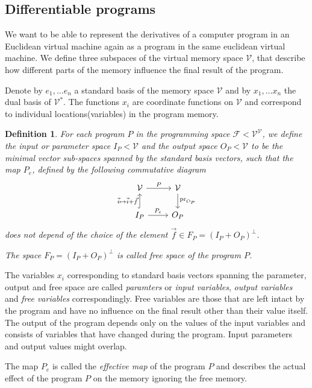 \documentclass[smallcondensed]{svjour3}
\newcommand{\VV}{\mathcal{V}}
\newcommand{\F}{\mathcal{F}}
\newtheorem{definicija}{Definition}[section]
\begin{document}
\subsection{Differentiable programs}
We want to be able to represent the derivatives of a computer program in an
Euclidean virtual machine again as a program in the same euclidean virtual
machine. We define three subspaces of the virtual memory space $\VV$, that
describe how different parts of the memory influence the final result of the
program.   

Denote by $e_1,\ldots e_n$ a standard basis of the memory space $\VV$ and by
$x_1,\ldots x_n$ the dual basis of $\VV^*$. The functions $x_i$ are coordinate
functions on $\VV$ and correspond to individual locations(variables) in the
program memory.

\begin{definicija}
  For each program $P$ in the programming space $\F<\VV^\VV$,
  we define the \emph{input} or \emph{parameter space} $I_P<\VV$ and the
  \emph{output space} $O_P<\VV$ to be the minimal vector sub-spaces spanned by
  the standard basis vectors, such that the map $P_e$, defined by the following
  commutative diagram 
\begin{equation} 
    \label{eq:induced_map}
\begin{tikzcd}
  \VV \arrow{r}{P} & 
  \VV \arrow{d}{\mathrm{pr}_{O_P}}\\
  I_P \arrow[hook]{u}{\vec{i}\mapsto \vec{i}+\vec{f}} 
  \arrow{r}{P_e}& O_P
\end{tikzcd}
  \end{equation}
does not depend of the choice of the element 
$\vec{f}\in F_P=(I_P+O_P)^\perp$.

The space $F_P=(I_P+O_P)^\perp$ is called \emph{free space} of the program $P$.
\end{definicija}

The variables $x_i$ corresponding to standard
basis vectors spanning the parameter, output and free space are called
\emph{paramters} or \emph{input variables}, \emph{output variables} and
\emph{free variables} correspondingly. Free variables are those that are
left intact by the program and have no influence on the final result other than
their value itself. The output of the program depends only on the values
of the input variables and consists of variables that have changed during
the program. Input parameters and output values might overlap. 

The map $P_e$ is called the \emph{effective map} of the program $P$ and
describes the actual effect of the program $P$ on the memory
ignoring the free memory. 
\end{document}
